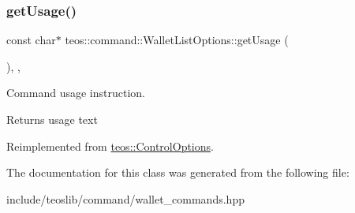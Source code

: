 \subsubsection{\texorpdfstring{get\+Usage()}{getUsage()}}
{\footnotesize\ttfamily const char$\ast$ teos\+::command\+::\+Wallet\+List\+Options\+::get\+Usage (\begin{DoxyParamCaption}{ }\end{DoxyParamCaption})\hspace{0.3cm}{\ttfamily [inline]}, {\ttfamily [protected]}, {\ttfamily [virtual]}}



Command \textquotesingle{}usage\textquotesingle{} instruction. 

\begin{DoxyReturn}{Returns}
usage text 
\end{DoxyReturn}


Reimplemented from \mbox{\hyperlink{classteos_1_1_control_options_a0aa5671f9bc750ed5280c26c543874f3}{teos\+::\+Control\+Options}}.



The documentation for this class was generated from the following file\+:\begin{DoxyCompactItemize}
\item 
include/teoslib/command/wallet\+\_\+commands.\+hpp\end{DoxyCompactItemize}
